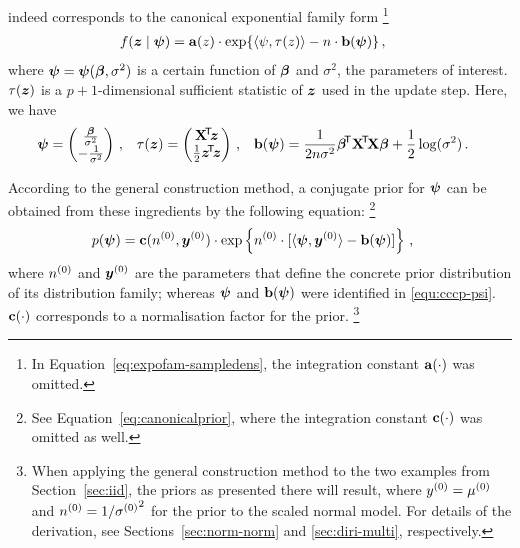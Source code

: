 indeed corresponds to the canonical exponential family form%
\footnote{In Equation~\ref{eq:expofam-sampledens}, the integration constant $\mathbf{a}(\cdot)$
was omitted.}
\begin{align*}
f({\bm z}\mid\boldsymbol{\psi}) &= \mathbf{a}(z) \cdot \exp \{\langle \psi, \tau(z) \rangle - n \cdot \mathbf{b}(\boldsymbol{\psi})\}\,,
\end{align*}
where $\boldsymbol{\psi}=\boldsymbol{\psi}(\boldsymbol{\beta}, \sigma^2)$ is a certain function of $\boldsymbol{\beta}$ and $\sigma^2$,
the parameters of interest. $\tau({\bm z})$ is a $p+1$-dimensional sufficient statistic of ${\bm z}$ used in the update step. 
Here, we have
\begin{align}
\boldsymbol{\psi}          &= \begin{pmatrix} \frac{\boldsymbol{\beta}}{\sigma^2} \\ -\frac{1}{\sigma^2} \end{pmatrix}\,, &
\tau({\bm z})       &= \begin{pmatrix} \mathbf{X}^{{\mbox{\!\scriptsize\textsf{T}}}} \! {\bm z} \\ \frac{1}{2} {\bm z}^{{\mbox{\!\scriptsize\textsf{T}}}} \! {\bm z} \end{pmatrix}\,, &
\mathbf{b}(\boldsymbol{\psi}) &= \frac{1}{2n\sigma^2} \boldsymbol{\beta}^{{\mbox{\!\scriptsize\textsf{T}}}} \mathbf{X}^{{\mbox{\!\scriptsize\textsf{T}}}} \! \mathbf{X} \boldsymbol{\beta} + \frac{1}{2}\log(\sigma^2)\,.
\label{equ:cccp-psi}
\end{align}

According to the general construction method, a conjugate prior %
for $\boldsymbol{\psi}$ can be obtained from these ingredients by the following equation:%
\footnote{See Equation~\ref{eq:canonicalprior}, where the integration constant $\mathbf{c}(\cdot)$ was omitted as well.}
\begin{align}
p(\boldsymbol{\psi}) &= \mathbf{c}(n^{(0)},{\bm y}^{(0)})\cdot \exp\left\{ n^{(0)} \cdot [\langle \boldsymbol{\psi}, {\bm y}^{(0)} \rangle - \mathbf{b}(\boldsymbol{\psi})] \right\}\,,
\label{eq:canonicalconjugate-festschrift}
\end{align}
where $n^{(0)}$ and ${\bm y}^{(0)}$ are the parameters that define the concrete prior distribution of its distribution family;
whereas $\boldsymbol{\psi}$ and $\mathbf{b}(\boldsymbol{\psi})$ were identified in \eqref{equ:cccp-psi}.
$\mathbf{c}(\cdot)$ corresponds to a normalisation factor for the prior.%
\footnote{When applying the general construction method to the two examples from Section~\ref{sec:iid},
the priors as presented there will result,
where $y^{(0)} = \mu^{(0)}$ and $n^{(0)} = 1/{\sigma^{(0)}}^2$ for the prior to the scaled normal model.
For details of the derivation, see Sections~\ref{sec:norm-norm} and \ref{sec:diri-multi}, respectively.}

